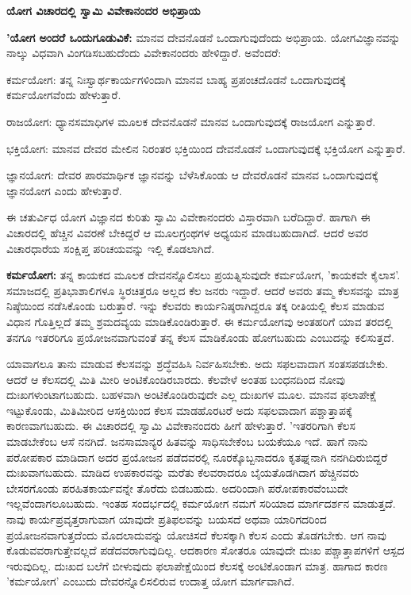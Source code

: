 \textbf{ಯೋಗ ವಿಚಾರದಲ್ಲಿ ಸ್ವಾಮಿ ವಿವೇಕಾನಂದರ ಅಭಿಪ್ರಾಯ}

\textbf{'ಯೋಗ ಅಂದರೆ ಒಂದುಗೂಡುವಿಕೆ:} ಮಾನವ ದೇವನೊಡನೆ ಒಂದಾಗುವುದೆಂದು ಅಭಿಪ್ರಾಯ. ಯೋಗವಿಜ್ಞಾನವನ್ನು ನಾಲ್ಕು ವಿಧವಾಗಿ ವಿಂಗಡಿಸಬಹುದೆಂದು ವಿವೇಕಾನಂದರು ಹೇಳಿದ್ದಾರೆ. ಅವೆಂದರೆ:

 ಕರ್ಮಯೋಗ: ತನ್ನ ನಿಃಸ್ವಾರ್ಥಕಾರ್ಯಗಳಿಂದಾಗಿ ಮಾನವ ಬಾಹ್ಯ ಪ್ರಪಂಚದೊಡನೆ ಒಂದಾಗುವುದಕ್ಕೆ ಕರ್ಮಯೋಗವೆಂದು ಹೇಳುತ್ತಾರೆ.

 ರಾಜಯೋಗ: ಧ್ಯಾನಸಮಾಧಿಗಳ ಮೂಲಕ ದೇವನೊಡನೆ ಮಾನವ ಒಂದಾಗುವುದಕ್ಕೆ ರಾಜಯೋಗ ಎನ್ನುತ್ತಾರೆ.

 ಭಕ್ತಿಯೋಗ: ಮಾನವ ದೇವರ ಮೇಲಿನ ನಿರಂತರ ಭಕ್ತಿಯಿಂದ ದೇವನೊಡನೆ ಒಂದಾಗುವುದಕ್ಕೆ ಭಕ್ತಿಯೋಗ ಎನ್ನುತ್ತಾರೆ.

 ಜ್ಞಾನಯೋಗ: ದೇವರ ಪಾರಮಾರ್ಥಿಕ ಜ್ಞಾನವನ್ನು ಬೆಳೆಸಿಕೊಂಡು ಆ ದೇವರೊಡನೆ ಮಾನವ ಒಂದಾಗುವುದಕ್ಕೆ ಜ್ಞಾನಯೋಗ ಎಂದು ಹೇಳುತ್ತಾರೆ.

ಈ ಚತುರ್ವಿಧ ಯೋಗ ವಿಜ್ಞಾನದ ಕುರಿತು ಸ್ವಾಮಿ ವಿವೇಕಾನಂದರು ವಿಸ್ತಾರವಾಗಿ ಬರೆದಿದ್ದಾರೆ. ಹಾಗಾಗಿ ಈ ವಿಚಾರದಲ್ಲಿ ಹೆಚ್ಚಿನ ವಿವರಣೆ ಬೇಕಿದ್ದರೆ ಆ ಮೂಲಗ್ರಂಥಗಳ ಅಧ್ಯಯನ ಮಾಡಬಹುದಾಗಿದೆ. ಆದರೆ ಅವರ ವಿಚಾರಧಾರೆಯ ಸಂಕ್ಷಿಪ್ತ ಪರಿಚಯವನ್ನು ಇಲ್ಲಿ ಕೊಡಲಾಗಿದೆ.

\textbf{ಕರ್ಮಯೋಗ:} ತನ್ನ ಕಾಯಕದ ಮೂಲಕ ದೇವನನ್ನೊಲಿಸಲು ಪ್ರಯತ್ನಿಸುವುದೇ ಕರ್ಮಯೋಗ, 'ಕಾಯಕವೇ ಕೈಲಾಸ'. ಸಮಾಜದಲ್ಲಿ ಪ್ರತಿಭಾಶಾಲಿಗಳೂ ಸ್ಥಿರಚಿತ್ತರೂ ಅಲ್ಲದ ಕೆಲ ಜನರು ಇದ್ದಾರೆ. ಆದರೆ ಅವರು ತಮ್ಮ ಕೆಲಸವನ್ನು ಮಾತ್ರ ನಿಷ್ಠೆಯಿಂದ ನಡೆಸಿಕೊಂಡು ಬರುತ್ತಾರೆ. ಇನ್ನು ಕೆಲವರು ಕಾರ್ಯನಿಷ್ಠರಾಗಿದ್ದರೂ ತಕ್ಕ ರೀತಿಯಲ್ಲಿ ಕೆಲಸ ಮಾಡುವ ವಿಧಾನ ಗೊತ್ತಿಲ್ಲದೆ ತಮ್ಮ ಶ್ರಮದವ್ಯಯ ಮಾಡಿಕೊಂಡಿರುತ್ತಾರೆ. ಈ ಕರ್ಮಯೋಗವು ಅಂತಹರಿಗೆ ಯಾವ ತರದಲ್ಲಿ ತನಗೂ ಇತರರಿಗೂ ಪ್ರಯೋಜನವಾಗುವಂತೆ ತನ್ನ ಕೆಲಸ ಮಾಡಿಕೊಂಡು ಹೋಗಬಹುದು ಎಂಬುದನ್ನು ಕಲಿಸುತ್ತದೆ.

ಯಾವಾಗಲೂ ತಾನು ಮಾಡುವ ಕೆಲಸವನ್ನು ಶ್ರದ್ಧೆವಹಿಸಿ ನಿರ್ವಹಿಸಬೇಕು. ಅದು ಸಫಲವಾದಾಗ ಸಂತಸಪಡಬೇಕು. ಆದರೆ ಆ ಕೆಲಸದಲ್ಲಿ ಮಿತಿ ಮೀರಿ ಅಂಟಿಕೊಂಡಿರಬಾರದು. ಕೆಲವೇಳೆ ಅಂತಹ ಬಂಧನದಿಂದ ನೋವು ದುಃಖಗಳುಂಟಾಗಬಹುದು. ಬಹಳವಾಗಿ ಅಂಟಿಕೊಂಡಿರುವುದೇ ಎಲ್ಲ ದುಃಖಗಳ ಮೂಲ. ಮಾನವ ಫಲಾಪೇಕ್ಷೆ ಇಟ್ಟುಕೊಂಡು, ಮಿತಿಮೀರಿದ ಆಸಕ್ತಿಯಿಂದ ಕೆಲಸ ಮಾಡಹೊರಟರೆ ಅದು ಸಫಲವಾದಾಗ ಪಶ್ಚಾತ್ತಾಪಕ್ಕೆ ಕಾರಣವಾಗಬಹುದು. ಈ ವಿಚಾರದಲ್ಲಿ ಸ್ವಾಮಿ ವಿವೇಕಾನಂದರು ಹೀಗೆ ಹೇಳುತ್ತಾರೆ. 'ಇತರರಿಗಾಗಿ ಕೆಲಸ ಮಾಡಬೇಕೆಂಬ ಆಸೆ ನನಗಿದೆ. ಜನಸಾಮಾನ್ಯರ ಹಿತವನ್ನು ಸಾಧಿಸಬೇಕೆಂಬ ಬಯಕೆಯೂ ಇದೆ. ಹಾಗೆ ನಾನು ಪರೋಪಕಾರ ಮಾಡಿದಾಗ ಅದರ ಪ್ರಯೋಜನ ಪಡೆದವರಲ್ಲಿ ನೂರಕ್ಕೊಬ್ಬನಾದರೂ ಕೃತಘ್ನನಾಗಿ ನನಗಿದಿರುಬಿದ್ದರೆ ದುಃಖವಾಗಬಹುದು. ಮಾಡಿದ ಉಪಕಾರವನ್ನು ಮರೆತು ಕೆಲವರಾದರೂ ಬೈಯತೊಡಗಿದಾಗ ಹೆಚ್ಚಿನವರು ಬೇಸರಗೊಂಡು ಪರಹಿತಕಾರ್ಯವನ್ನೇ ತೊರೆದು ಬಿಡಬಹುದು. ಅದರಿಂದಾಗಿ ಪರೋಪಕಾರವೆಂಬುದೇ ಇಲ್ಲವೆಂದಾಗಲೂಬಹುದು. ಇಂತಹ ಸಂದರ್ಭದಲ್ಲಿ ಕರ್ಮಯೋಗ ನಮಗೆ ಸರಿಯಾದ ಮಾರ್ಗದರ್ಶನ ಮಾಡುತ್ತದೆ. ನಾವು ಕಾರ್ಯಪ್ರವೃತ್ತರಾಗುವಾಗ ಯಾವುದೇ ಪ್ರತಿಫಲವನ್ನು ಬಯಸದೆ ಅಥವಾ ಯಾರಿಗದರಿಂದ ಪ್ರಯೋಜನವಾಗುತ್ತದೆಂದು ಮೊದಲಾದುವನ್ನು ಯೋಚಿಸದೆ ಕೆಲಸಕ್ಕಾಗಿ ಕೆಲಸ ಎಂದು ತೊಡಗಬೇಕು. ಆಗ ನಾವು ಕೊಡುವವರಾಗುತ್ತೇವಲ್ಲದೆ ಪಡೆದವರಾಗುವುದಿಲ್ಲ. ಆದಕಾರಣ ಸೋತರೂ ಯಾವುದೇ ದುಃಖ ಪಶ್ಚಾತ್ತಾಪಗಳಿಗೆ ಆಸ್ಪದ ಇರುವುದಿಲ್ಲ. ದುಃಖದ ಬಲೆಗೆ ಬೀಳುವುದು ಫಲಾಪೇಕ್ಷೆಯಿಂದ ಕೆಲಸಕ್ಕೆ ಅಂಟಿಕೊಂಡಾಗ ಮಾತ್ರ. ಹಾಗಾದ ಕಾರಣ 'ಕರ್ಮಯೋಗ' ಎಂಬುದು ದೇವರನ್ನೊಲಿಸಲಿರುವ ಉದಾತ್ತ ಯೋಗ ಮಾರ್ಗವಾಗಿದೆ.

